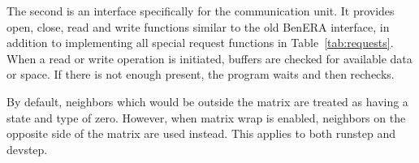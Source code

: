 The second is an interface specifically for the communication unit.
It provides open, close, read and write functions similar to the old BenERA interface, in addition to implementing all special request functions in Table~\ref{tab:requests}.
When a read or write operation is initiated, buffers are checked for available data or space.
If there is not enough present, the program waits and then rechecks.


By default, neighbors which would be outside the matrix are treated as having a state and type of zero.
However, when matrix wrap is enabled, neighbors on the opposite side of the matrix are used instead.
This applies to both runstep and devstep.
